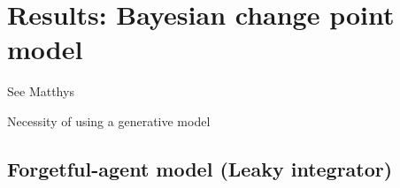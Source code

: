 \documentclass[profile,final,english, draft]{article}%
\begin{document}
\section{Results: Bayesian change point model}




See Matthys

Necessity of using a generative model


\subsection{Forgetful-agent model (Leaky integrator)}
%
%
%
%
\end{document}

